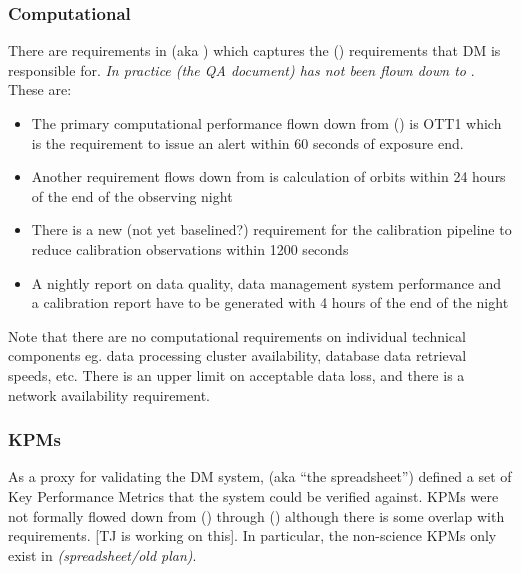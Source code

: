 \subsubsection{Computational}

There are requirements in  (aka \DMSR) which captures the  (\OSS) requirements that DM is responsible for. \textit{In practice  (the QA document) has not been flown down to }. These are:

\begin{itemize}

\item The primary computational performance flown down from  (\LSR) is OTT1 which is the requirement to issue an alert within 60 seconds of exposure end.

\item Another requirement flows down from  is calculation of orbits within 24 hours of the end of the observing night

\item There is a new (not yet baselined?) requirement for the calibration pipeline to reduce calibration observations within 1200 seconds

\item A nightly report on data quality, data management system performance and a calibration report have to be generated with 4 hours of the end of the night

\end{itemize}

Note that there are no computational requirements on individual technical components eg. data processing cluster availability, database data retrieval speeds, etc. There is an upper limit on acceptable data loss, and there is a network availability requirement.

\subsubsection{KPMs}


As a proxy for validating the DM system,  (aka “the spreadsheet”) defined a set of Key Performance Metrics that the system could be verified against. KPMs were not formally flowed down from  (\LSR) through  (\OSS) although there is some overlap with  requirements. [TJ is working on this]. In particular, the non-science KPMs only exist in  \textit{(spreadsheet/old plan)}.

